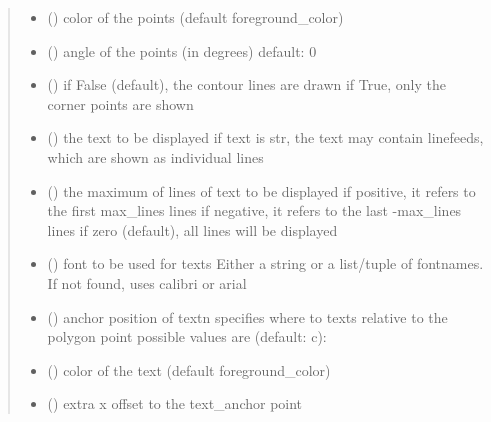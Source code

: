 \documentclass[letterpaper,10pt,english]{sphinxmanual}
\begin{document}
\begin{fulllineitems}
\begin{quote}
\begin{description}
\begin{itemize}
\item {} 
 () \textendash{} color of the points (default foreground\_color)

\item {} 
 () \textendash{} angle of the points (in degrees) 
default: 0

\item {} 
 () \textendash{} if False (default), the contour lines are drawn 
if True, only the corner points are shown

\item {} 
 (\sphinxstyleliteralemphasis{, }) \textendash{} the text to be displayed 
if text is str, the text may contain linefeeds, which are shown as individual lines

\item {} 
 () \textendash{} the maximum of lines of text to be displayed 
if positive, it refers to the first max\_lines lines 
if negative, it refers to the last -max\_lines lines 
if zero (default), all lines will be displayed

\item {} 
 () \textendash{} font to be used for texts 
Either a string or a list/tuple of fontnames.
If not found, uses calibri or arial

\item {} 
 () \textendash{} anchor position of text\textbar{}n\textbar{}
specifies where to texts relative to the polygon
point 
possible values are (default: c): 

\item {} 
 () \textendash{} color of the text (default foreground\_color)

\item {} 
 () \textendash{} extra x offset to the text\_anchor point


\end{itemize}
\end{description}
\end{quote}
\end{fulllineitems}
\end{document}
